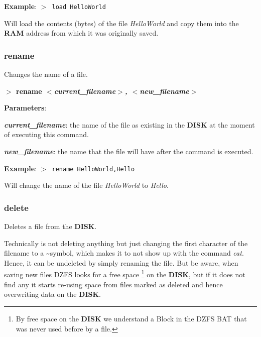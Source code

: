 \documentclass[a4paper,11pt]{article}
\begin{document}
        \textbf{Example}: \texttt{$>$ load HelloWorld}

        Will load the contents (bytes) of the file \textit{HelloWorld} and copy
        them into the \textbf{RAM} address from which it was originally saved.

        \subsubsection{{\color{blue}rename}}
        Changes the name of a file.

        \hspace{1.9cm}\textbf{$>$ rename \textit{$<$current\_filename$>$,
        $<$new\_filename$>$}}

        \textbf{Parameters}:

        \hspace{1cm}\textbf{\textit{current\_filename}}: the name of the file as
        existing in the \textbf{DISK} at the moment of executing this command.
        
        \hspace{1cm}\textbf{\textit{new\_filename}}: the name that the file will
        have after the command is executed.

        \textbf{Example}: \texttt{$>$ rename HelloWorld,Hello}

        Will change the name of the file \textit{HelloWorld} to \textit{Hello}.

        \subsubsection{{\color{blue}delete}}
        Deletes a file from the \textbf{DISK}.

        Technically is not deleting anything but just changing the first
        character of the filename to a \textasciitilde symbol, which makes it to
        not show up with the command \textit{cat}. Hence, it can be undeleted by
        simply renaming the file. But be aware, when saving new files DZFS looks
        for a free space \footnote{By free space on the \textbf{DISK} we
        understand a Block in the DZFS BAT that was never used before by a
        file.} on the \textbf{DISK}, but if it does not find any it starts
        re-using space from files marked as deleted and hence overwriting data
        on the \textbf{DISK}.
\end{document}
